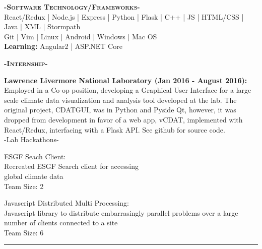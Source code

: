 \documentclass[12pt]{article}
\begin{document}
\center
\color{black}
\textbf{\textsc{-Software Technology/Frameworks-}}\\
\medskip
\color{Cerulean}React/Redux | Node.js  | Express | Python | Flask  | C++ | JS | HTML/CSS | Java | XML | Stormpath\color{gray}\\
\smallskip
Git | Vim | Linux | Android | Windows | Mac OS\\
\smallskip
\textbf{Learning:}
Angular2 | ASP.NET Core
\color{black}
\begin{center}
\textbf{\textsc{-Internship-}}\\
\end{center}
\begin{footnotesize}

\flushleft
\color{Cerulean}\textbf{Lawrence Livermore National Laboratory (Jan 2016 - August 2016):} 
\color{Black}Employed in a Co-op position, developing a Graphical User Interface for a large scale climate data visualization and analysis tool developed at the lab. The original project, CDATGUI, was in \color{TealBlue}Python and Pyside Qt, \color{Black} however, it was dropped from development in favor of a web app, vCDAT, implemented with \color{TealBlue}React/Redux\color{Black}, interfacing with a \color{TealBlue}Flask \color{Black}API. See github for source code.\\

\center
-Lab Hackathons-
\begin{multicols}{2}
\center
\color{Cerulean}ESGF Seach Client:\\ \color{black}
Recreated ESGF Search client for accessing\\
global climate data\\
Team Size: 2

\columnbreak

\color{Cerulean}Javascript Distributed Multi Processing:\\ \color{black}
Javascript library to distribute embarrasingly parallel problems over a large number of clients connected to a site\\
Team Size: 6


\end{multicols}
\medskip

\end{footnotesize}

\noindent\rule{19cm}{0.4pt}
\end{document}
